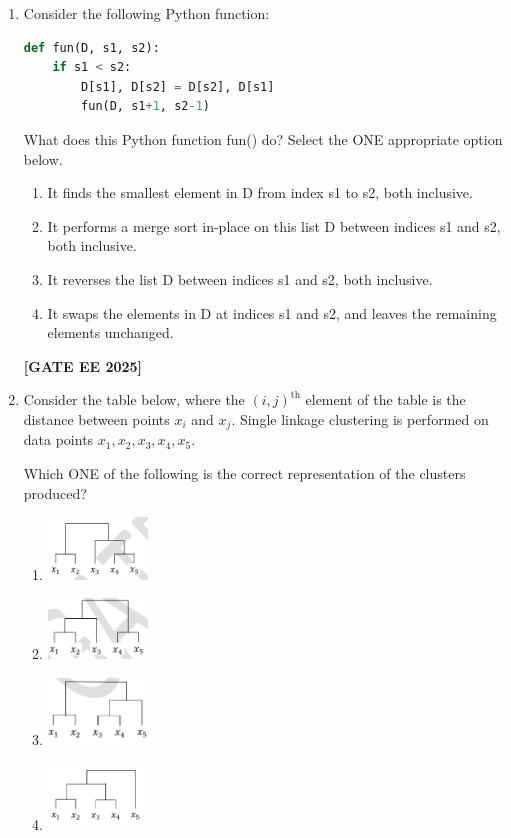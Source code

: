 \documentclass[journal]{IEEEtran}
\newcommand{\qfooter}{%
  \begin{flushright}\footnotesize\textbf{[GATE EE 2025]}\end{flushright}\vspace{1em}%
}
\begin{document}
\begin{enumerate}[leftmargin=*,label=\arabic*.]
\item Consider the following Python function:
\begin{lstlisting}[language=Python]
def fun(D, s1, s2):
    if s1 < s2:
        D[s1], D[s2] = D[s2], D[s1]
        fun(D, s1+1, s2-1)
\end{lstlisting}
What does this Python function fun() do? Select the ONE appropriate option below.
\begin{multicols}{2}
\begin{enumerate}[label=(\Alph*)]
\item It finds the smallest element in D from index s1 to s2, both inclusive.
\item It performs a merge sort in-place on this list D between indices s1 and s2, both inclusive.
\item It reverses the list D between indices s1 and s2, both inclusive.
\item It swaps the elements in D at indices s1 and s2, and leaves the remaining elements unchanged.
\end{enumerate} \qfooter
\end{multicols}

\item Consider the table below, where the $(i, j)^{\text{th}}$ element of the table is the distance between points $x_i$ and $x_j$. Single linkage clustering is performed on data points $x_1, x_2, x_3, x_4, x_5$.



Which ONE of the following is the correct representation of the clusters produced?
\begin{enumerate}
    \item \includegraphics[width=0.22\textwidth]{figs/42a.png} \hfill
    \item \includegraphics[width=0.22\textwidth]{figs/42b.png} \hfill
    \item \includegraphics[width=0.22\textwidth]{figs/42c.png} \hfill
    \item \includegraphics[width=0.22\textwidth]{figs/42d.png}


\end{enumerate}
\end{enumerate}
\end{document}
